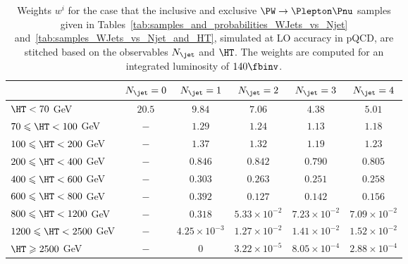 \begin{table}
\centering
\def\arraystretch{1.3}
\begin{tabular}{l|c|c|c|c|c}
\hline
                                & $N_{\jet} = 0$ & $N_{\jet} = 1$      & $N_{\jet} = 2$      & $N_{\jet} = 3$      & $N_{\jet} = 4$       \\ 
\hline
\hline
               $\HT < 70$   GeV & $20.5$         & $9.84$              & $7.06$              & $4.38$              &  $5.01$              \\
  $70 \leqslant \HT < 100$  GeV & $-$            & $1.29$              & $1.24$              & $1.13$              &  $1.18$              \\
 $100 \leqslant \HT < 200$  GeV & $-$            & $1.37$              & $1.32$              & $1.19$              &  $1.23$              \\
 $200 \leqslant \HT < 400$  GeV & $-$            & $0.846$             & $0.842$             & $0.790$             &  $0.805$             \\
 $400 \leqslant \HT < 600$  GeV & $-$            & $0.303$             & $0.263$             & $0.251$             &  $0.258$             \\
 $600 \leqslant \HT < 800$  GeV & $-$            & $0.392$             & $0.127$             & $0.142$             &  $0.156$             \\
 $800 \leqslant \HT < 1200$ GeV & $-$            & $0.318$             & $5.33\times10^{-2}$ & $7.23\times10^{-2}$ &  $7.09\times10^{-2}$ \\
$1200 \leqslant \HT < 2500$ GeV & $-$            & $4.25\times10^{-3}$ & $1.27\times10^{-2}$ & $1.41\times10^{-2}$ &  $1.52\times10^{-2}$ \\
       $\HT \geqslant 2500$ GeV & $-$            & $0$                 & $3.22\times10^{-5}$ & $8.05\times10^{-4}$ &  $2.88\times10^{-4}$ \\ 
\hline
\end{tabular}
\caption{
  Weights $w^{i}$ for the case that the inclusive and exclusive $\PW \to \Plepton\Pnu$ samples 
  given in Tables~\ref{tab:samples_and_probabilities_WJets_vs_Njet} and~\ref{tab:samples_WJets_vs_Njet_and_HT}, simulated at LO accuracy in pQCD,
  are stitched based on the observables $N_{\jet}$ and $\HT$.
  The weights are computed for an integrated luminosity of $140\fbinv$.
}
\label{tab:weights_WJets_vs_Njet_and_HT}
\end{table}
